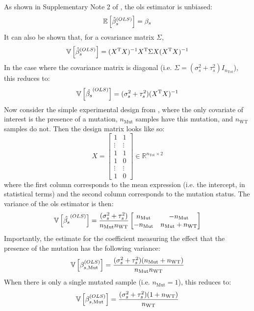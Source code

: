 As shown in Supplementary Note 2 of \cite[REF][]{pimentelDifferentialAnalysisRNAseq2017}, the \gls{ols} estimator is unbiased:
%
\begin{equation}
  \mathbb{E} \left[  \hat{\beta}_s^{(OLS)}  \right] = \beta_s
\end{equation}
%
It can also be shown that, for a covariance matrix $\Sigma$,
%
\begin{equation}
  \mathbb{V} \left[  \hat{\beta}_s^{(OLS)}  \right] = (X^{\mathrm{T}} X)^{-1} X^{\mathrm{T}} \Sigma X (X^{\mathrm{T}} X)^{-1}
\end{equation}
%
In the case where the covariance matrix is diagonal (i.e. $\Sigma = (\sigma_s^2 + \tau_s^2)I_{n_\mathrm{Tot}}$), this reduces to:
%
\begin{equation}
  \mathbb{V} \left[  \hat{\beta_s}^{(OLS)}  \right] = (\sigma_s^2 + \tau_s^2)(X^{\mathrm{T}} X)^{-1}
\end{equation}
%
Now consider the simple experimental design from , where the only covariate of interest is the presence of a mutation, $n_\mathrm{Mut}$ samples have this mutation, and $n_\mathrm{WT}$ samples do not.
Then the design matrix looks like so:
%
\begin{equation}
  X = \begin{bmatrix}
    1      & 1      \\
    \vdots & \vdots \\
    1      & 1      \\
    1      & 0      \\
    \vdots & \vdots \\
    1      & 0
  \end{bmatrix}
  \in \mathbb{R}^{n_\mathrm{Tot} \times 2}
\end{equation}
%
where the first column corresponds to the mean expression (i.e. the intercept, in statistical terms) and the second column corresponds to the mutation status.
The variance of the \gls{ols} estimator is then:
%
\begin{equation}
  \mathbb{V} \left[  \hat{\beta_s}^{(OLS)}  \right] = \frac{(\sigma_s^2 + \tau_s^2)}{n_\mathrm{Mut} n_\mathrm{WT}}
  \begin{bmatrix}
    n_\mathrm{Mut}   & -n_\mathrm{Mut}                \\
    - n_\mathrm{Mut} & n_\mathrm{Mut} + n_\mathrm{WT} \\
  \end{bmatrix}
\end{equation}
%
Importantly, the estimate for the coefficient measuring the effect that the presence of the mutation has the following variance:
%
\begin{equation}
  \mathbb{V} \left[  \beta_{s,\mathrm{Mut}}^{(OLS)}  \right] = \frac{(\sigma_s^2 + \tau_s^2)(n_\mathrm{Mut} + n_\mathrm{WT})}{n_\mathrm{Mut} n_\mathrm{WT}}
\end{equation}
%
When there is only a single mutated sample (i.e. $n_\mathrm{Mut} = 1$), this reduces to:
%
\begin{equation}
  \mathbb{V} \left[  \beta_{s,\mathrm{Mut}}^{(OLS)}  \right] = \frac{(\sigma_s^2 + \tau_s^2)(1 + n_\mathrm{WT})}{n_\mathrm{WT}}
\end{equation}

